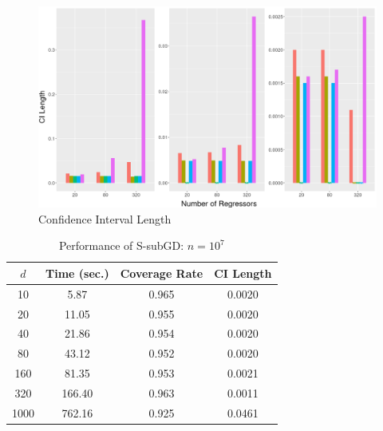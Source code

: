 \documentclass[beamer, t]{beamer}
\begin{document}
\begin{frame}
	
	\begin{figure}[!htbp]
		\caption{Confidence Interval Length} \label{fig:ci}
		\centering
		\vskip10pt
			\includegraphics[width=\textwidth]{figures/fig_ci_length.png}
	\end{figure}
	
\end{frame}


\begin{frame}
	
	\begin{table}[htb]
		\centering
		\caption{Performance of S-subGD: $n=10^7$} 
		\label{tb_SGD_rs}
		\begin{tabular}{cccc
			}
			\hline
			{$d$} & {Time (sec.)} & {Coverage Rate} & {CI Length} \\ 
			\hline
			10 & 5.87 & 0.965 & 0.0020 \\ 
			20 & 11.05 & 0.955 & 0.0020 \\ 
			40 & 21.86 & 0.954 & 0.0020 \\ 
			80 & 43.12 & 0.952 & 0.0020 \\ 
			160 & 81.35 & 0.953 & 0.0021 \\ 
			320 & 166.40 & 0.963 & 0.0011 \\ 
			1000 & 762.16 & 0.925 & 0.0461 \\ 
			\hline
		\end{tabular}
	\end{table}
	
	
\end{frame}
\end{document}
